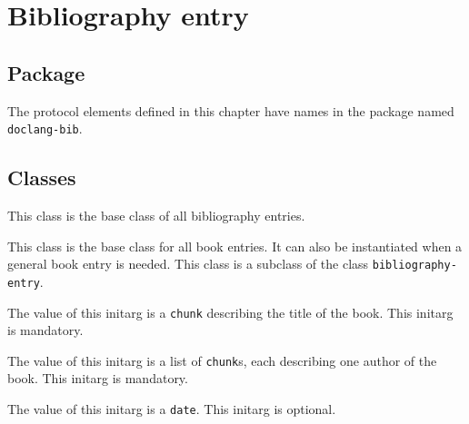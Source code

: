 \chapter{Bibliography entry}
\label{chap-bibliography-entry}

\section{Package}

The protocol elements defined in this chapter have names in the
package named \texttt{doclang-bib}.

\section{Classes}


This class is the base class of all bibliography entries.


This class is the base class for all book entries.  It can also be
instantiated when a general book entry is needed.  This class is a
subclass of the class \texttt{bibliography-entry}.


The value of this initarg is a \texttt{chunk} describing the title of
the book.  This initarg is mandatory.


The value of this initarg is a list of \texttt{chunk}s, each
describing one author of the book.  This initarg is mandatory.



The value of this initarg is a \texttt{date}.  This initarg is
optional.
